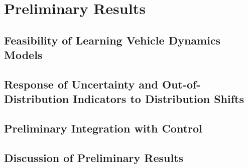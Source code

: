 \documentclass[12pt,a4paper]{report}
\begin{document}

\chapter{Preliminary Results}

%

\section{Feasibility of Learning Vehicle Dynamics Models}


\section{Response of Uncertainty and Out-of-Distribution Indicators to Distribution Shifts}


\section{Preliminary Integration with Control}


\section{Discussion of Preliminary Results}

\end{document}
